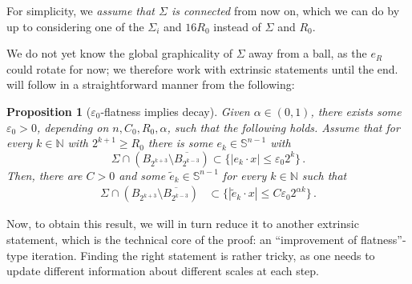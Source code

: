 \documentclass{article}
\newcommand{\N}{\mathbb{N}}
\newcommand{\Sp}{\mathbb{S}}
\newcommand{\ep}{\varepsilon}
\newtheorem{proposition}[theorem]{Proposition}
\theoremstyle{definition}
\begin{document}
For simplicity, we \textit{assume that $\Sigma$ is connected} from now on, which we can do by  up to considering one of the $\Sigma_i$ and $16R_0$ instead of $\Sigma$ and $R_0$.

We do not yet know the global graphicality of $\Sigma$ away from a ball, as the $e_R$ could rotate for now; we therefore work with extrinsic statements until the end.  will follow in a straightforward manner from the following:
\begin{proposition}[$\ep_0$-flatness implies decay]\label{prop:dec2}
Given $\alpha\in(0,1)$, there exists some $\ep_0>0$, depending on $n,C_0,R_0,\alpha$, such that the following holds. Assume that for every $k\in\N$ with $2^{k+1}\geq R_0$ there is some $e_k\in\Sp^{n-1}$ with
$$\Sigma \cap (B_{2^{k+3}}\setminus \overline{B_{2^{k-3}}})\subset \{|e_k\cdot x|\leq \ep_0 2^k\}\,.$$
Then, there are $C>0$ and some $\widetilde e_k\in\Sp^{n-1}$ for every $k\in\N$ such that
\begin{align*}
    \Sigma \cap (B_{2^{k+3}}\setminus \overline{B_{2^{k-3}}})&\subset \{|\widetilde e_k\cdot x|\leq C\ep_0 2^{\alpha k}\}\,.
\end{align*}
\end{proposition}
Now, to obtain this result, we will in turn reduce it to another extrinsic statement, which is the technical core of the proof: an ``improvement of flatness''-type iteration. Finding the right statement is rather tricky, as one needs to update different information about different scales at each step.
\end{document}
